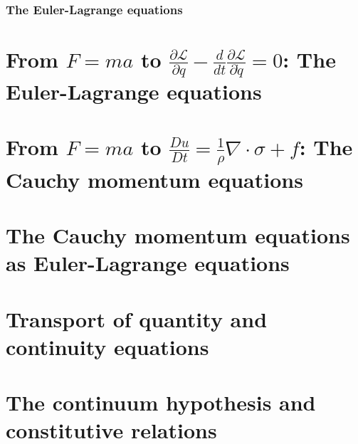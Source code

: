 \documentclass[11pt,a4paper]{memoir}
\newcommand{\fancyL}{\mathcal{L}}
\newcommand{\Part}[2]{\frac{\partial #1}{\partial #2}}
\begin{document}
\subsubsection{The Euler-Lagrange equations}


\section{From $F = ma$ to $\Part{\fancyL}{q} - \frac{d}{dt}\Part{\fancyL}{\dot{q}} = 0$: The Euler-Lagrange equations} %
\section{From $F = ma$ to $\frac{Du}{Dt} = \frac{1}{\rho}\nabla\cdot\sigma + f$: The Cauchy momentum equations} %
\section{The Cauchy momentum equations as Euler-Lagrange equations} %
\section{Transport of quantity and continuity equations} %
\section{The continuum hypothesis and constitutive relations} %
\end{document}
